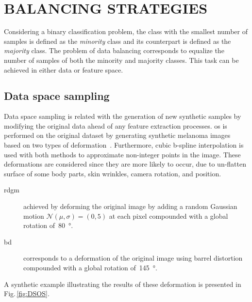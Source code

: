 \graphicspath{ {./content/method/figures/} }

\section{\uppercase{Balancing strategies}}\label{sec:met}

\noindent Considering a binary classification problem, the class with the smallest number of samples is defined as the \textit{minority} class and its counterpart is defined as the \textit{majority} class.
The problem of data balancing corresponds to equalize the number of samples of both the minority and majority classes. This task can be achieved in either data or feature space.

\subsection{Data space sampling}

Data space sampling is related with the generation of new synthetic samples by modifying the original data ahead of any feature extraction processes. 
\Ac{os} is performed on the original dataset by generating synthetic melanoma images based on two types of deformation~\cite{rastgoo2015ensemble}. Furthermore, cubic b-spline interpolation is used with both methods to approximate non-integer points in the image.
These deformations are considered since they are more likely to occur, due to un-flatten surface of some body parts, skin wrinkles, camera rotation, and position. 

 
\begin{description}
	\item[\Ac{rdgm}] achieved by deforming the original image by adding a random Gaussian motion $\mathcal{N}(\mu, \sigma) = (0,5)$ at each pixel compounded with a global rotation of~\SI{80}{\degree}.
	\item[\Ac{bd}] corresponds to a deformation of the original image using barrel distortion compounded with a global rotation of~\SI{145}{\degree}.
\end{description}
A synthetic example illustrating the results of these deformation is presented in Fig.\,\ref{fig:DSOS}.

